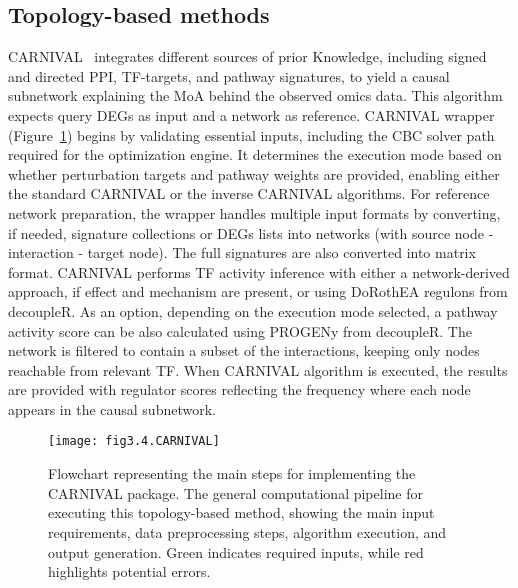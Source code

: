 \subsection{Topology-based methods} %
\label{sub:topologybasedmethods}

\gls{CARNIVAL}~\cite{RN41} integrates different sources of prior Knowledge, including signed and directed \gls{PPI}, \gls{TF}-targets, and pathway signatures, to yield a causal subnetwork explaining the \gls{MoA} behind the observed omics data. This algorithm expects query \gls{DEGs} as input and a network as reference. \gls{CARNIVAL} wrapper (Figure~\ref{fig:fig3.4.CARNIVAL}) begins by validating essential inputs, including the CBC solver path required for the optimization engine. 
It determines the execution mode based on whether perturbation targets and pathway weights are provided, enabling either the standard \gls{CARNIVAL} or the inverse \gls{CARNIVAL} algorithms. 
For reference network preparation, the wrapper handles multiple input formats by converting, if needed, signature collections or \gls{DEGs} lists into networks (with source node - interaction - target node).
The full signatures are also converted into matrix format. \gls{CARNIVAL} performs \gls{TF} activity inference with either a network-derived approach, if effect and mechanism are present, or using DoRothEA regulons from decoupleR. 
As an option, depending on the execution mode selected, a pathway activity score can be also calculated using PROGENy from decoupleR. 
The network is filtered to contain a subset of the interactions, keeping only nodes reachable from relevant \gls{TF}.
When \gls{CARNIVAL} algorithm is executed, the results are provided with regulator scores reflecting the frequency where each node appears in the causal subnetwork.

\begin{figure}[htbp]
    \centering
    \texttt{[image: fig3.4.CARNIVAL]}
    \caption[Flowchart representing the main steps for implementing the CARNIVAL package.]{Flowchart representing the main steps for implementing the \gls{CARNIVAL} package. The general computational pipeline for executing this topology-based method, showing the main input requirements, data preprocessing steps, algorithm execution, and output generation. Green indicates required inputs, while red highlights potential errors.}
    \label{fig:fig3.4.CARNIVAL}
\end{figure}

